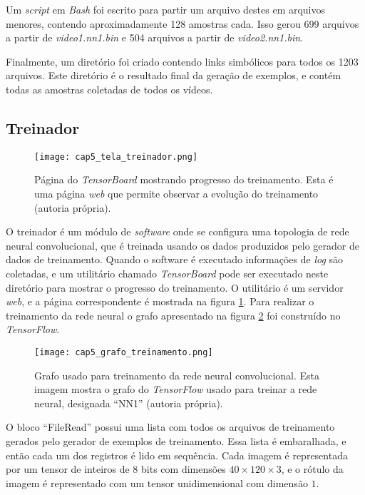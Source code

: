 Um \emph{script} em \emph{Bash} foi escrito para partir um arquivo destes em
arquivos menores, contendo aproximadamente 128 amostras cada. Isso gerou
699 arquivos a partir de \emph{video1.nn1.bin} e 504 arquivos a partir de
\emph{video2.nn1.bin}.

Finalmente, um diretório foi criado contendo links simbólicos para todos os
1203 arquivos. Este diretório é o resultado final da geração de exemplos,
e contém todas as amostras coletadas de todos os vídeos.

\subsection{Treinador}

\begin{figure}[!htb]
	\centering
	\texttt{[image: cap5\_tela\_treinador.png]}
	\caption[Página do \emph{TensorBoard} mostrando progresso do treinamento]{
		Página do \emph{TensorBoard} mostrando progresso do treinamento.
		Esta é uma página \emph{web} que permite observar a evolução do
		treinamento (autoria própria).}
	\label{fig:cap5_tela_treinador}
\end{figure}

O treinador é um módulo de \emph{software} onde se configura uma topologia
de rede neural convolucional, que é treinada usando os dados produzidos pelo
gerador de dados de treinamento. Quando o software é executado informações de
\emph{log} são coletadas, e um utilitário chamado \emph{TensorBoard} pode ser
executado neste diretório para mostrar o progresso do treinamento. O utilitário
é um servidor \emph{web}, e a página correspondente é mostrada na figura
\ref{fig:cap5_tela_treinador}.
Para realizar o treinamento da rede neural o grafo apresentado na figura
\ref{fig:cap5_grafo_treinamento} foi construído no \emph{TensorFlow}.

\begin{figure}[!htb]
	\centering
	\texttt{[image: cap5\_grafo\_treinamento.png]}
	\caption[Grafo usado para treinamento da rede neural convolucional]{
		Grafo usado para treinamento da rede neural convolucional.
		Esta imagem mostra o grafo do \emph{TensorFlow} usado para treinar
		a rede neural, designada ``NN1'' (autoria própria).}
	\label{fig:cap5_grafo_treinamento}
\end{figure}

O bloco ``FileRead'' possui uma lista com todos os arquivos de treinamento
gerados pelo gerador de exemplos de treinamento. Essa lista é embaralhada, e
então cada um dos registros é lido em sequência. Cada imagem é representada por
um tensor de inteiros de 8 bits com dimensões $40 \times 120 \times 3$, e o
rótulo da imagem é representado com um tensor unidimensional com dimensão $1$.

